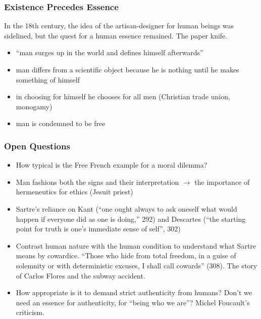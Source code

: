 \documentclass[xcolor=dvipsnames]{beamer}
\begin{document}
\begin{frame}
  \frametitle{Existence Precedes Essence}
  In the 18th century, the idea of the artisan-designer for human
  beings was sidelined, but the quest for a human essence remained.
  The paper knife.
  \begin{itemize}
  \item ``man surges up in the world and defines himself afterwards''
  \item man differs from a scientific object because he is nothing
    until he makes something of himself
  \item in choosing for himself he chooses for all men (Christian
    trade union, monogamy)
  \item man is condemned to be free
  \end{itemize}
\end{frame}

\begin{frame}
  \frametitle{Open Questions}
  \begin{itemize}
  \item How typical is the Free French example for a moral dilemma?
  \item Man fashions both the signs and their interpretation
    $\longrightarrow$ the importance of hermeneutics for ethics
    (Jesuit priest)
  \item Sartre's reliance on Kant (``one ought always to ask oneself
    what would happen if everyone did as one is doing,'' 292) and
    Descartes (``the starting point for truth is one's immediate sense
    of self'', 302)
  \item Contrast human nature with the human condition to understand
    what Sartre means by cowardice. ``Those who hide from total
    freedom, in a guise of solemnity or with deterministic excuses, I
    shall call cowards'' (308). The story of Carlos Flores and the
    subway accident.
  \item How appropriate is it to demand strict authenticity from
    humans? Don't we need an essence for authenticity, for ``being who
    we are''? Michel Foucault's criticism.
  \end{itemize}
\end{frame}
\end{document}
